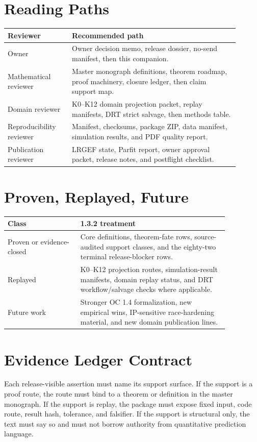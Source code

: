 \documentclass[11pt,a4paper]{article}
\begin{document}
\section*{Reading Paths}
\begin{longtable}{>{\raggedright\arraybackslash}p{0.25\linewidth}>{\raggedright\arraybackslash}p{0.65\linewidth}}
\textbf{Reviewer} & \textbf{Recommended path}\\
\hline
Owner & Owner decision memo, release dossier, no-send manifest, then this companion.\\
Mathematical reviewer & Master monograph definitions, theorem roadmap, proof machinery, closure ledger, then claim support map.\\
Domain reviewer & K0--K12 domain projection packet, replay manifests, DRT strict salvage, then methods table.\\
Reproducibility reviewer & Manifest, checksums, package ZIP, data manifest, simulation results, and PDF quality report.\\
Publication reviewer & LRGEF state, Parfit report, owner approval packet, release notes, and postflight checklist.\\
\end{longtable}

\section*{Proven, Replayed, Future}
\begin{longtable}{>{\raggedright\arraybackslash}p{0.28\linewidth}>{\raggedright\arraybackslash}p{0.58\linewidth}}
\textbf{Class} & \textbf{1.3.2 treatment}\\
\hline
Proven or evidence-closed & Core definitions, theorem-fate rows, source-audited support classes, and the eighty-two terminal release-blocker rows.\\
Replayed & K0--K12 projection routes, simulation-result manifests, domain replay status, and DRT workflow/salvage checks where applicable.\\
Future work & Stronger OC 1.4 formalization, new empirical wins, IP-sensitive race-hardening material, and new domain publication lines.\\
\end{longtable}

\section*{Evidence Ledger Contract}
Each release-visible assertion must name its support surface. If the support is a proof route, the route must bind to a theorem or definition in the master monograph. If the support is replay, the package must expose fixed input, code route, result hash, tolerance, and falsifier. If the support is structural only, the text must say so and must not borrow authority from quantitative prediction language.
\end{document}
